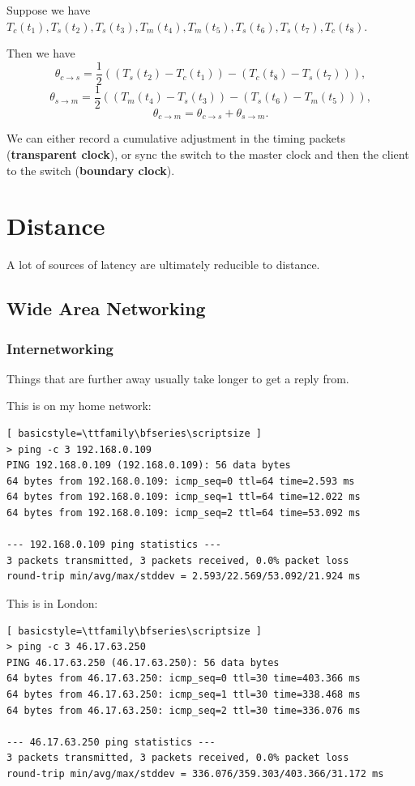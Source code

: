 \documentclass{article}
\newcommand{\sectionquote}[1]{%
    \def\insertsquote{\small #1}%
}
\newcommand{\insertsquote}{}
\renewcommand{\insertsquote}{}%
\begin{document}
Suppose we have $T_c(t_1), T_s(t_2), T_s(t_3), T_m(t_4), T_m(t_5), T_s(t_6), T_s(t_7), T_c(t_8)$.

Then we have
$$\theta_{c\to s} = \frac{1}{2}\left((T_s(t_2)-T_c(t_1)) - (T_c(t_8)-T_s(t_7))\right),$$
$$\theta_{s\to m} = \frac{1}{2}\left((T_m(t_4)-T_s(t_3)) - (T_s(t_6)-T_m(t_5))\right),$$
$$\theta_{c\to m} = \theta_{c\to s} + \theta_{s\to m}.$$

We can either record a cumulative adjustment in the timing packets (\textbf{transparent clock}), or sync the switch to the master clock and then the client to the switch (\textbf{boundary clock}).

\sectionquote{``Speed is the essence of war.'' Sun Tzu \\ ``Remote fountains are of little help to nearby fires.'' Han Fei}
\section{Distance}
A lot of sources of latency are ultimately reducible to distance.

\subsection{Wide Area Networking}
\subsubsection{Internetworking}
Things that are further away usually take longer to get a reply from.

This is on my home network:
\begin{lstlisting}[ basicstyle=\ttfamily\bfseries\scriptsize ]
> ping -c 3 192.168.0.109
PING 192.168.0.109 (192.168.0.109): 56 data bytes
64 bytes from 192.168.0.109: icmp_seq=0 ttl=64 time=2.593 ms
64 bytes from 192.168.0.109: icmp_seq=1 ttl=64 time=12.022 ms
64 bytes from 192.168.0.109: icmp_seq=2 ttl=64 time=53.092 ms

--- 192.168.0.109 ping statistics ---
3 packets transmitted, 3 packets received, 0.0% packet loss
round-trip min/avg/max/stddev = 2.593/22.569/53.092/21.924 ms
\end{lstlisting}

This is in London:
\begin{lstlisting}[ basicstyle=\ttfamily\bfseries\scriptsize ]
> ping -c 3 46.17.63.250
PING 46.17.63.250 (46.17.63.250): 56 data bytes
64 bytes from 46.17.63.250: icmp_seq=0 ttl=30 time=403.366 ms
64 bytes from 46.17.63.250: icmp_seq=1 ttl=30 time=338.468 ms
64 bytes from 46.17.63.250: icmp_seq=2 ttl=30 time=336.076 ms

--- 46.17.63.250 ping statistics ---
3 packets transmitted, 3 packets received, 0.0% packet loss
round-trip min/avg/max/stddev = 336.076/359.303/403.366/31.172 ms
\end{lstlisting}
\end{document}
